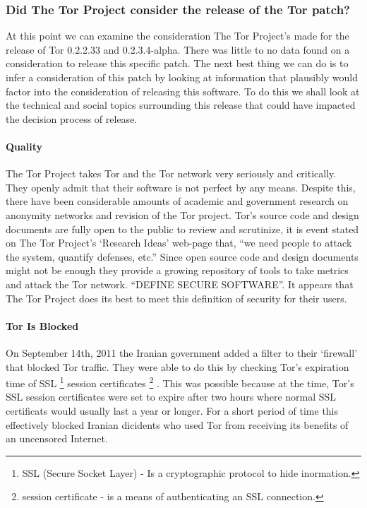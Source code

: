 \documentclass[11pt]{article}
\begin{document}
\begin{multicols}{2}
\subsubsection{Did The Tor Project consider the release of the Tor patch?} 

At this point we can examine the consideration The Tor Project's made for the
release of Tor 0.2.2.33 and 0.2.3.4-alpha. There was little to no data found on
a consideration to release this specific patch. The next best thing we
can do is to infer a consideration of this patch by looking at information that
plausibly would factor into the consideration of releasing this software. To do
this we shall look at the technical and social topics surrounding this release
that could have impacted the decision process of release.

\paragraph{Quality}

The Tor Project takes Tor and the Tor network very seriously and critically.
They openly admit that their software is not perfect by any means. Despite this,
there have been considerable amounts of academic and government research on
anonymity networks and revision of the Tor project. \cite{Tor:ResearchPapers}
Tor's source code and design documents are fully open to the public to review
and scrutinize, it is event stated on The Tor Project's `Research Ideas' web-page
that, ``we need people to attack the system, quantify defenses, etc.''
\cite{Tor:ResearchIdeas, Tor:2011} Since open source code and design documents
might not be enough  they provide a growing repository of tools to take metrics
and attack the Tor network. \cite{Tor:ResearchHome} ``DEFINE SECURE SOFTWARE''.
It appears that The Tor Project does its best to meet this definition of
security for their users.  

\paragraph{Tor Is Blocked}

On September 14th, 2011 the Iranian government added a filter to their `firewall'
that blocked Tor traffic. They were able to do this by checking Tor's expiration
time of SSL \footnote{SSL (Secure Socket Layer) - Is a cryptographic protocol to
hide inormation.} session certificates \footnote{session certificate - is a
means of authenticating an SSL connection.} . This was possible because at the
time, Tor's SSL session certificates were set to expire after two hours where normal SSL
certificats would usually last a year or longer. For a short period of time this
effectively blocked Iranian dicidents who used Tor from receiving its benefits
of an uncensored Internet. \cite{IranBlocksTorSameDayFix}


\end{multicols}
\end{document}
